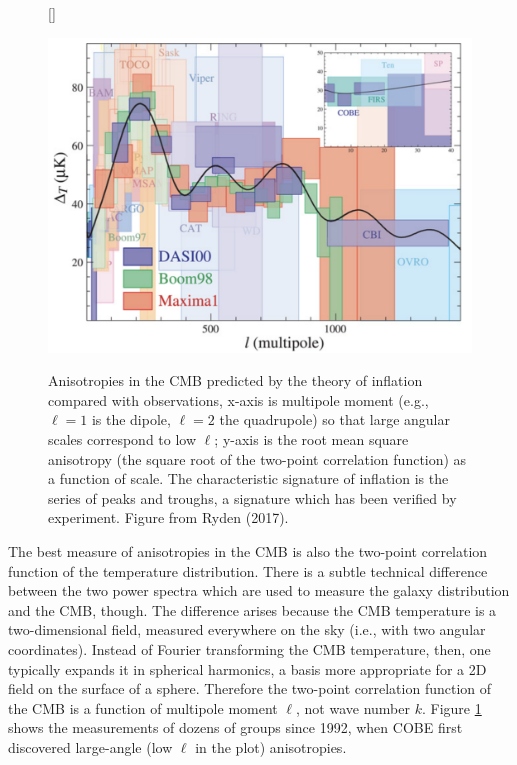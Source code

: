 \documentclass[a4paper,11pt]{article}
\begin{document}
\begin{figure}[h]
    [\FBwidth]
    {\caption{\footnotesize{Anisotropies in the CMB predicted by the theory of inflation compared with observations, x-axis is multipole moment (e.g., $\ell = 1$ is the dipole, $\ell = 2$ the quadrupole) so that large angular scales correspond to low $\ell$; y-axis is the root mean square anisotropy (the square root of the two-point correlation function) as a function of scale. The characteristic signature of inflation is the series of peaks and troughs, a signature which has been verified by experiment. Figure from Ryden (2017).}}
    \label{fig:cmbpowerspec}}
    {\includegraphics[width=12cm]{figures/CMBPowerSpectrum.png}}
\end{figure}

{\noindent}The best measure of anisotropies in the CMB is also the two-point correlation function of the temperature distribution. There is a subtle technical difference between the two power spectra which are used to measure the galaxy distribution and the CMB, though. The difference arises because the CMB temperature is a two-dimensional field, measured everywhere on the sky (i.e., with two angular coordinates). Instead of Fourier transforming the CMB temperature, then, one typically expands it in spherical harmonics, a basis more appropriate for a 2D field on the surface of a sphere. Therefore the two-point correlation function of the CMB is a function of multipole moment $\ell$, not wave number $k$. Figure \ref{fig:cmbpowerspec} shows the measurements of dozens of groups since 1992, when COBE first discovered large-angle (low $\ell$ in the plot) anisotropies.
\end{document}

